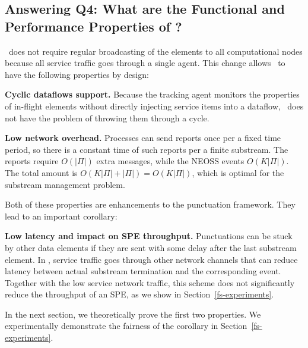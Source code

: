 \subsection*{Answering Q4: What are the Functional and Performance Properties of \tracker?}
\label{tracker-properties}

\tracker\ does not require regular broadcasting of the elements to all computational nodes because all service traffic goes through a single agent. This change allows \tracker\ to have the following properties by design:

{\bf Cyclic dataflows support.} Because the tracking agent monitors the properties of in-flight elements without directly injecting service items into a dataflow, \tracker\ does not have the problem of throwing them through a cycle.

{\bf Low network overhead.} Processes can send reports once per a fixed time period, so there is a constant time of such reports per a finite substream. The reports require $O(|\Pi|)$ extra messages, while the NEOSS events $O(K|\Pi|)$. The total amount is $O(K|\Pi| + |\Pi|) = O(K|\Pi|)$, which is optimal for the substream management problem.

Both of these properties are enhancements to the punctuation framework. They lead to an important corollary: 

{\bf Low latency and impact on SPE throughput.} Punctuations can be stuck by other data elements if they are sent with some delay after the last substream element. In \tracker, service traffic goes through other network channels that can reduce latency between actual substream termination and the corresponding event. Together with the low service network traffic, this scheme does not significantly reduce the throughput of an SPE, as we show in Section~\ref{fs-experiments}.

In the next section, we theoretically prove the first two properties. We experimentally demonstrate the fairness of the corollary in Section~\ref{fs-experiments}.
